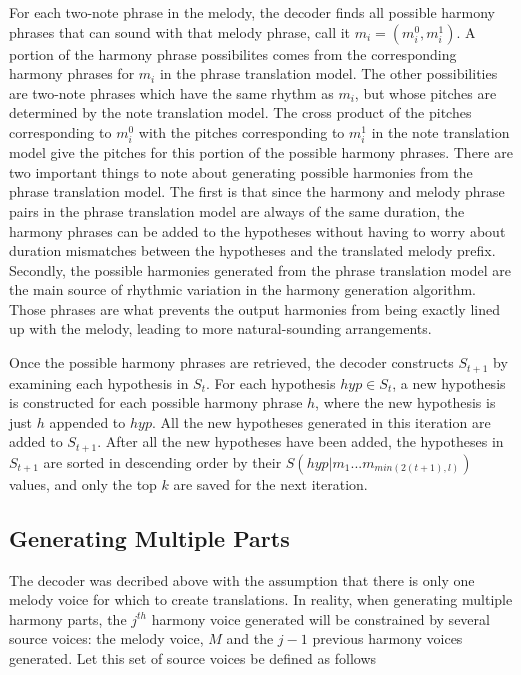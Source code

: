 \documentclass{sig-alternate}
\begin{document}
For each two-note phrase in the melody, the decoder finds all possible harmony phrases that can sound with that melody phrase, call it $m_{i} = (m_{i}^{0}, m_{i}^{1})$. A portion of the harmony phrase possibilites comes from the corresponding harmony phrases for $m_{i}$ in the phrase translation model. The other possibilities are two-note phrases which have the same rhythm as $m_{i}$, but whose pitches are determined by the note translation model. The cross product of the pitches corresponding to $m_{i}^{0}$ with the pitches corresponding to $m_{i}^{1}$ in the note translation model give the pitches for this portion of the possible harmony phrases. There are two important things to note about generating possible harmonies from the phrase translation model. The first is that since the harmony and melody phrase pairs in the phrase translation model are always of the same duration, the harmony phrases can be added to the hypotheses without having to worry about duration mismatches between the hypotheses and the translated melody prefix. Secondly, the possible harmonies generated from the phrase translation model are the main source of rhythmic variation in the harmony generation algorithm. Those phrases are what prevents the output harmonies from being exactly lined up with the melody, leading to more natural-sounding arrangements.

Once the possible harmony phrases are retrieved, the decoder constructs $S_{t + 1}$ by examining each hypothesis in $S_{t}$. For each hypothesis $hyp \in S_{t}$, a new hypothesis is constructed for each possible harmony phrase $h$, where the new hypothesis is just $h$ appended to $hyp$. All the new hypotheses generated in this iteration are added to $S_{t + 1}$. After all the new hypotheses have been added, the hypotheses in $S_{t + 1}$ are sorted in descending order by their $S(hyp | m_{1} ... m_{min(2(t +1), l)})$ values, and only the top $k$ are saved for the next iteration.

\subsection {Generating Multiple Parts}
The decoder was decribed above with the assumption that there is only one melody voice for  which to create translations. In reality, when generating multiple harmony parts, the $j^{th}$ harmony voice generated will be constrained by several source voices: the melody voice, $M$ and the $j-1$ previous harmony voices generated. Let this set of source voices be defined as follows\\
\end{document}
